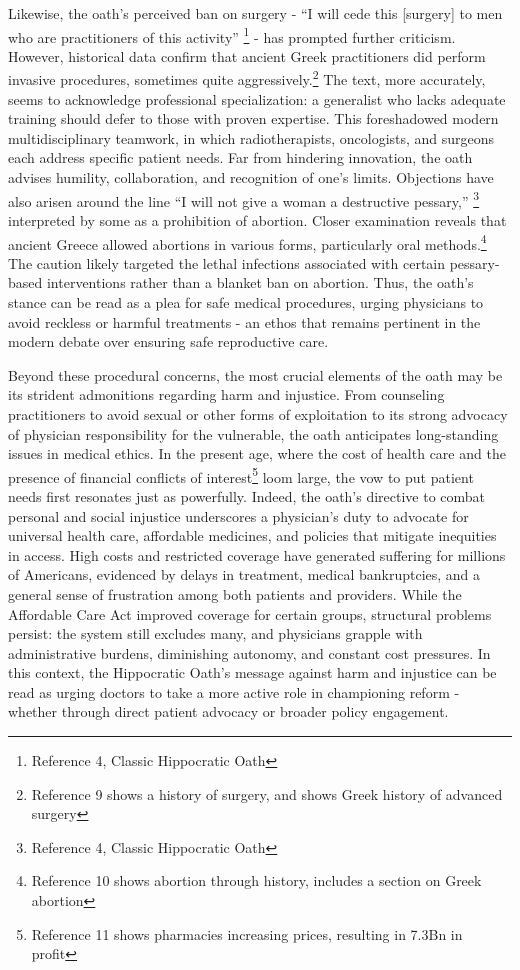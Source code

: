 \documentclass[12pt]{article}
\begin{document}
\bigskip

Likewise, the oath’s perceived ban on surgery - “I will cede this [surgery] to men who are practitioners of this activity”
\footnote{Reference 4, Classic Hippocratic Oath} - has prompted further criticism. However, historical data confirm that 
ancient Greek practitioners did perform invasive procedures, sometimes quite aggressively.\footnote{Reference 9 shows a history of surgery, and shows Greek history of advanced surgery} The text, more accurately, 
seems to acknowledge professional specialization: a generalist who lacks adequate training should defer to those with proven expertise. 
This foreshadowed modern multidisciplinary teamwork, in which radiotherapists, oncologists, and surgeons each address specific 
patient needs. Far from hindering innovation, the oath advises humility, collaboration, and recognition of one’s limits. 
Objections have also arisen around the line “I will not give a woman a destructive pessary,”
\footnote{Reference 4, Classic Hippocratic Oath} interpreted by some as a prohibition of abortion. Closer examination reveals 
that ancient Greece allowed abortions in various forms, particularly oral methods.\footnote{Reference 10 shows abortion through history, includes a section on Greek abortion} The caution likely targeted the lethal 
infections associated with certain pessary-based interventions rather than a blanket ban on abortion. Thus, the oath’s 
stance can be read as a plea for safe medical procedures, urging physicians to avoid reckless or harmful treatments - an ethos 
that remains pertinent in the modern debate over ensuring safe reproductive care.

\bigskip

Beyond these procedural concerns, the most crucial elements of the oath may be its strident admonitions regarding harm and injustice.
From counseling practitioners to avoid sexual or other forms of exploitation to its strong advocacy of physician responsibility for the vulnerable, 
the oath anticipates long-standing issues in medical ethics. In the present age, where the cost of health care and the presence of financial conflicts of interest\footnote{Reference 11 shows pharmacies increasing prices, resulting in 7.3Bn in profit } loom large, the vow to put patient needs first resonates
just as powerfully. Indeed, the oath’s directive to combat personal and social injustice underscores a physician’s duty to advocate for universal
health care, affordable medicines, and policies that mitigate inequities in access. High costs and restricted coverage have generated suffering 
for millions of Americans, evidenced by delays in treatment, medical bankruptcies, and a general sense of frustration among both patients and 
providers. While the Affordable Care Act improved coverage for certain groups, structural problems persist: the system still excludes many, 
and physicians grapple with administrative burdens, diminishing autonomy, and constant cost pressures. In this context, the 
Hippocratic Oath’s message against harm and injustice can be read as urging doctors to take a more active role in championing reform - 
whether through direct patient advocacy or broader policy engagement.
\end{document}
